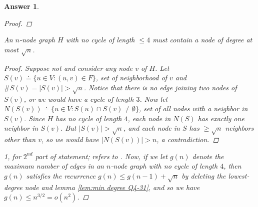 \documentclass[11pt]{article}
\theoremstyle{numberplain}
\theoremstyle{nonumberplain}
\newtheorem{proof}{Proof}
\newtheorem{ans}{Answer}
\newcommand{\0}{{\mathbf{0}}}
\begin{document}
\begin{ans}
\begin{enumerate}
\begin{proof}
\end{proof}
\begin{lem}
An $n$-node graph $H$ with no cycle of length $\leq 4$ must contain a node of degree at most $\sqrt{n}$.
\label{lem:min degree Q4-31}
\end{lem}
\begin{proof}
Suppose not and consider any node $v$ of $H$. Let $S(v)\doteq \{u\in V: (u,v)\in F\}$, set of neighborhood of $v$ and $\# S(v)=|S(v)|>\sqrt{n}$. Notice that there is no edge joining two nodes of $S(v)$, or we would have a cycle of length $3$. Now let $N(S(v))\doteq \{u\in V: S(u)\cap S(v)\neq\emptyset\}$, set of all nodes with a neighbor in $S(v)$. Since $H$ has no cycle of length $4$, each node in $N(S)$ has exactly one neighbor in $S(v)$. But $|S(v)| > \sqrt{n}$, and each node in $S$ has $\geq \sqrt{n}$ neighbors other than $v$, so we would have $|N(S(v))| > n$, a contradiction. 
\end{proof}
\begin{proof}[1, for $2^{nd}$ part of statement; refers to \cite{solcornell}] Now, if we let $g(n)$ denote the maximum number of edges in an $n$-node graph with no cycle of length $4$, then $g(n)$ satisfies the recurrence $g(n) \leq g(n-1) + \sqrt{n}$ by deleting the lowest-degree node and lemma \ref{lem:min degree Q4-31}, and so we have $g(n) \leq n^{3/2} = o(n^2)$.
\end{proof} 



\end{enumerate}
\end{ans}
\end{document}

